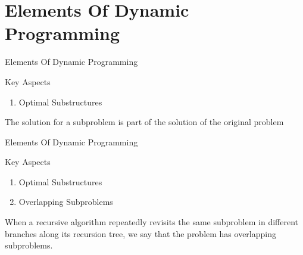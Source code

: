 \section{Elements Of Dynamic Programming}



\begin{frame}{Elements Of Dynamic Programming}
  \begin{block}{Key Aspects}
    \begin{enumerate}
      \item Optimal Substructures
    \end{enumerate}
    \pause
    The solution for a subproblem is part of the solution of the original problem
  \end{block}
\end{frame}



\begin{frame}{Elements Of Dynamic Programming}
  \begin{block}{Key Aspects}
    \begin{enumerate}
      \item Optimal Substructures
      \item Overlapping Subproblems
    \end{enumerate}
    \pause
    When a recursive algorithm repeatedly revisits the same subproblem in different branches along its recursion
    tree, we say that the problem has overlapping subproblems.
  \end{block}
\end{frame}


